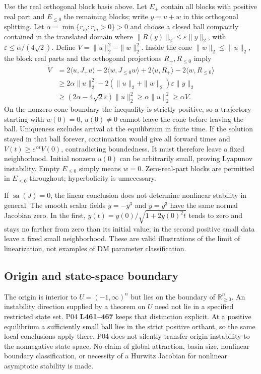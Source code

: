 \documentclass[11pt]{article}
\newcommand{\RR}{\mathbb R}
\newcommand{\sa}{\operatorname{sa}}
\newcommand{\lin}[1]{\textbf{L#1}}
\begin{document}
Use the real orthogonal block basis above. Let $E_+$ contain all blocks
with positive real part and $E_{\le0}$ the remaining blocks; write
$y=u+w$ in this orthogonal splitting. Let
$\alpha=\min\{r_m:r_m>0\}>0$ and choose a closed ball compactly contained in the translated domain where
$\|R(y)\|_2\le\varepsilon\|y\|_2$, with
$\varepsilon\le\alpha/(4\sqrt2)$. Define
$V=\|u\|_2^2-\|w\|_2^2$. Inside the cone $\|w\|_2\le\|u\|_2$,
the block real parts and the orthogonal projections $R_+,R_{\le0}$ imply
\begin{align*}
 \dot V
 &=2\langle u,J_+u\rangle-2\langle w,J_{\le0}w\rangle
       +2\langle u,R_+\rangle-2\langle w,R_{\le0}\rangle\\
 &\ge 2\alpha\|u\|_2^2
       -2(\|u\|_2+\|w\|_2)\varepsilon\|y\|_2\\
 &\ge (2\alpha-4\sqrt2\varepsilon)\|u\|_2^2
 \ge\alpha\|u\|_2^2\ge\alpha V.
\end{align*}
On the nonzero cone boundary the inequality is strictly positive, so
a trajectory starting with $w(0)=0$, $u(0)\ne0$ cannot leave the cone
before leaving the ball. Uniqueness excludes arrival at the equilibrium
in finite time. If the solution stayed in that ball forever, continuation
would give all forward times and $V(t)\ge e^{\alpha t}V(0)$, contradicting
boundedness. It must therefore leave a fixed neighborhood. Initial nonzero
$u(0)$ can be arbitrarily small, proving Lyapunov instability. Empty
$E_{\le0}$ simply means $w=0$. Zero-real-part blocks are permitted in
$E_{\le0}$ throughout; hyperbolicity is unnecessary.

If $\sa(J)=0$, the linear conclusion does not determine nonlinear stability
in general. The smooth scalar fields $\dot y=-y^3$ and $\dot y=y^3$ have
the same normal Jacobian zero. In the first,
$y(t)=y(0)/\sqrt{1+2y(0)^2t}$ tends to zero and stays no farther from
zero than its initial value; in the second positive small data leave a
fixed small neighborhood. These are valid illustrations of the limit of
linearization, not examples of DM parameter classification.

\subsection{Origin and state-space boundary}
The origin is interior to $U=(-1,\infty)^n$ but lies on the boundary of
$\RR_{\ge0}^n$. An instability direction supplied by a theorem on $U$
need not lie in a specified restricted state set. P04 \lin{461--467}
keeps that distinction explicit. At a positive equilibrium a sufficiently
small ball lies in the strict positive orthant, so the same local conclusions
apply there. P04 does not silently transfer origin instability to the
nonnegative state space. No claim of global attraction, basin size,
nonlinear boundary classification, or necessity of a Hurwitz Jacobian
for nonlinear asymptotic stability is made.
\end{document}

